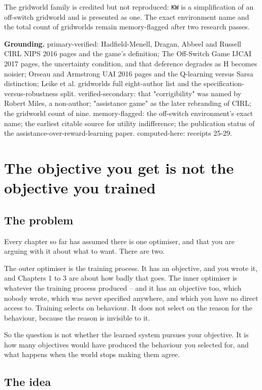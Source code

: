 The gridworld family is credited but not reproduced: \texttt{KW} is a simplification of an off-switch gridworld and is presented as one. The exact environment name and the total count of gridworlds remain memory-flagged after two research passes.

\textbf{Grounding.} primary-verified: Hadfield-Menell, Dragan, Abbeel and Russell CIRL NIPS 2016 pages and the game's definition; The Off-Switch Game IJCAI 2017 pages, the uncertainty condition, and that deference degrades as H becomes noisier; Orseau and Armstrong UAI 2016 pages and the Q-learning versus Sarsa distinction; Leike et al. gridworlds full eight-author list and the specification-versus-robustness split. verified-secondary: that "corrigibility" was named by Robert Miles, a non-author; "assistance game" as the later rebranding of CIRL; the gridworld count of nine. memory-flagged: the off-switch environment's exact name; the earliest citable source for utility indifference; the publication status of the assistance-over-reward-learning paper. computed-here: receipts 25-29.

\chapter{The objective you get is not the objective you trained}

\section*{The problem}

Every chapter so far has assumed there is one optimiser, and that you are arguing with it about what to want. There are two.

The outer optimiser is the training process. It has an objective, and you wrote it, and Chapters 1 to 3 are about how badly that goes. The inner optimiser is whatever the training process produced -- and it has an objective too, which nobody wrote, which was never specified anywhere, and which you have no direct access to. Training selects on behaviour. It does not select on the reason for the behaviour, because the reason is invisible to it.

So the question is not whether the learned system pursues your objective. It is how many objectives would have produced the behaviour you selected for, and what happens when the world stops making them agree.

\section*{The idea}

